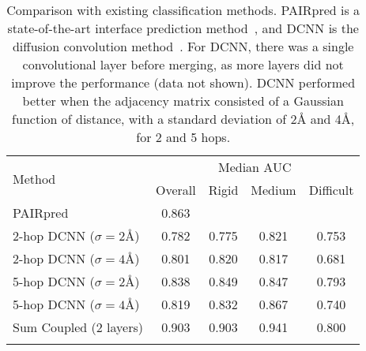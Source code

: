 \begin{table}
	\begin{center}
		\begin{tabular}{l c c c c }
			\toprule

			\multirow{2}{*}{Method} & \multicolumn{4}{c}{Median AUC} \\
			& Overall & Rigid & Medium & Difficult \\
			\midrule
			PAIRpred      & 0.863        & & & \\
			\midrule
			2-hop DCNN ($\sigma=2$\AA{}) & 0.782 & 0.775 & 0.821 & 0.753 \\
			2-hop DCNN ($\sigma=4$\AA{}) & 0.801 & 0.820 & 0.817 & 0.681 \\
			\midrule
			5-hop DCNN ($\sigma=2$\AA{}) & 0.838 & 0.849 & 0.847 & 0.793 \\ 
			5-hop DCNN ($\sigma=4$\AA{}) & 0.819 & 0.832 & 0.867 & 0.740 \\ 
			\midrule

			Sum Coupled (2 layers) & 0.903 & 0.903 & 0.941 & 0.800 \\ 
			\bottomrule
			\\
		\end{tabular}
		\caption{Comparison with existing classification methods. 
			PAIRpred is a state-of-the-art interface prediction method~\cite{minhas2014}, and DCNN is the diffusion convolution method~\cite{atwood2016}.
			For DCNN, there was a single convolutional layer before merging, as more layers did not improve the performance (data not shown). DCNN performed better when the adjacency matrix consisted of a Gaussian function of distance, with a standard deviation of 2\AA{} and 4\AA{}, for 2 and 5 hops.}
		\label{tab:results_compare}
	\end{center}
\end{table}

